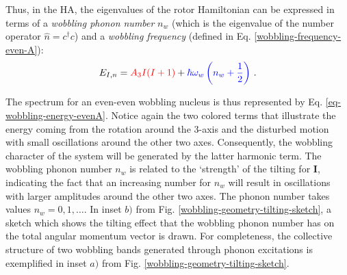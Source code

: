 Thus, in the HA, the eigenvalues of the rotor Hamiltonian can be expressed in terms of a \emph{wobbling phonon number} $n_w$ (which is the eigenvalue of the number operator $\hat{n}=c^\dagger c$) and a \emph{wobbling frequency} (defined in Eq. \ref{wobbling-frequency-even-A}):
\begin{align}
    E_{I,n}={\color{red}A_3I(I+1)}+{\color{blue}\hbar\omega_w\left(n_w+\frac{1}{2}\right)}\ .
    \label{eq-wobbling-energy-evenA}
\end{align}

The spectrum for an even-even wobbling nucleus is thus represented by Eq. \ref{eq-wobbling-energy-evenA}. Notice again the two colored terms that illustrate the energy coming from the rotation around the $3$-axis and the disturbed motion with small oscillations around the other two axes. Consequently, the wobbling character of the system will be generated by the latter harmonic term. The wobbling phonon number $n_w$ is related to the `strength' of the tilting for $\mathbf{I}$, indicating the fact that an increasing number for $n_w$ will result in oscillations with larger amplitudes around the other two axes. The phonon number takes values $n_w=0,1,\dots$. In inset $b)$ from Fig. \ref{wobbling-geometry-tilting-sketch}, a sketch which shows the tilting effect that the wobbling phonon number has on the total angular momentum vector is drawn. For completeness, the collective structure of two wobbling bands generated through phonon excitations is exemplified in inset $a)$ from Fig. \ref{wobbling-geometry-tilting-sketch}.

